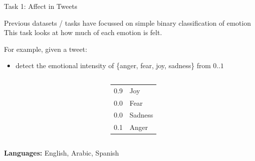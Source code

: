 \documentclass[10pt, compress]{beamer}
\begin{document}
\begin{frame}{Task 1: Affect in Tweets}

Previous datasets / tasks have focussed on simple binary classification of emotion
This task looks at how much of each emotion is felt.

For example, given a tweet:
\begin{itemize}
  \item detect the emotional intensity of \{anger, fear, joy, sadness\} from $0..1$
\end{itemize}

\begin{columns}
    \begin{column}{0.75\textwidth}
    \end{column}
    \begin{column}{0.2\textwidth}
        \begin{tabular}{rl}
          0.9 & Joy \\
          0.0 & Fear \\ 
          0.0 & Sadness \\ 
          0.1 & Anger \\
        \end{tabular}
    \end{column}
\end{columns}
%
\textbf{Languages:} English, Arabic, Spanish

\end{frame}
\end{document}
